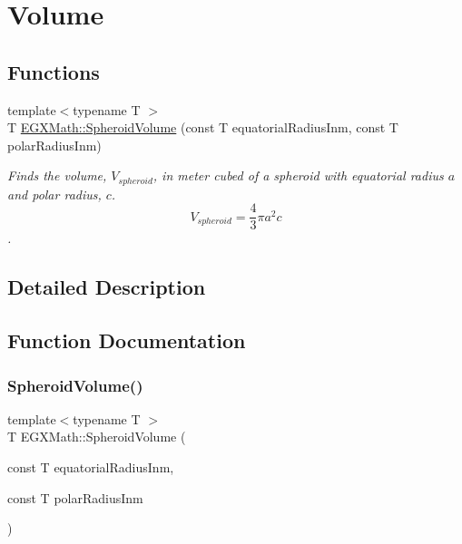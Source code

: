 \hypertarget{group___e_g_x_math-_geometry-3_d-_spheroid-_volume}{}\section{Volume}
\label{group___e_g_x_math-_geometry-3_d-_spheroid-_volume}
\subsection*{Functions}
\begin{DoxyCompactItemize}
\item 
{\footnotesize template$<$typename T $>$ }\\T \mbox{\hyperlink{group___e_g_x_math-_geometry-3_d-_spheroid-_volume_ga12125484235e94b8f2580f3476b05b92}{E\+G\+X\+Math\+::\+Spheroid\+Volume}} (const T equatorial\+Radius\+Inm, const T polar\+Radius\+Inm)
\begin{DoxyCompactList}\small\item\em Finds the volume, $V_{spheroid}$, in meter cubed of a spheroid with equatorial radius $a$ and polar radius, $c$. \[ V_{spheroid}=\frac{4}{3}\pi a^2 c \]. \end{DoxyCompactList}\end{DoxyCompactItemize}


\subsection{Detailed Description}


\subsection{Function Documentation}
\mbox{\label{group___e_g_x_math-_geometry-3_d-_spheroid-_volume_ga12125484235e94b8f2580f3476b05b92}} 
\subsubsection{\texorpdfstring{Spheroid\+Volume()}{SpheroidVolume()}}
{\footnotesize\ttfamily template$<$typename T $>$ \\
T E\+G\+X\+Math\+::\+Spheroid\+Volume (\begin{DoxyParamCaption}\item[{const T}]{equatorial\+Radius\+Inm,  }\item[{const T}]{polar\+Radius\+Inm }\end{DoxyParamCaption})}



